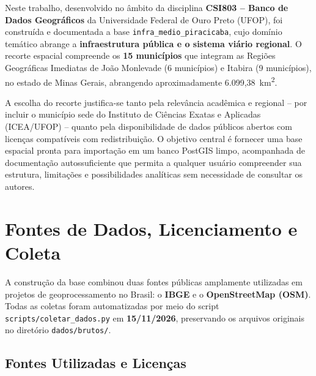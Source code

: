 \documentclass[
    12pt,
    oneside,
    a4paper,
    chapter=TITLE,
    section=TITLE,
    brazil
]{abntex2}
\begin{document}
Neste trabalho, desenvolvido no âmbito da disciplina \textbf{CSI803 -- Banco de Dados Geográficos} da Universidade Federal de Ouro Preto (UFOP), foi construída e documentada a base \texttt{infra\_medio\_piracicaba}, cujo domínio temático abrange a \textbf{infraestrutura pública e o sistema viário regional}. O recorte espacial compreende os \textbf{15 municípios} que integram as Regiões Geográficas Imediatas de João Monlevade (6 municípios) e Itabira (9 municípios), no estado de Minas Gerais, abrangendo aproximadamente 6.099,38~km\textsuperscript{2}.

A escolha do recorte justifica-se tanto pela relevância acadêmica e regional -- por incluir o município sede do Instituto de Ciências Exatas e Aplicadas (ICEA/UFOP) -- quanto pela disponibilidade de dados públicos abertos com licenças compatíveis com redistribuição. O objetivo central é fornecer uma base espacial pronta para importação em um banco PostGIS limpo, acompanhada de documentação autossuficiente que permita a qualquer usuário compreender sua estrutura, limitações e possibilidades analíticas sem necessidade de consultar os autores.

\chapter{Fontes de Dados, Licenciamento e Coleta}

A construção da base combinou duas fontes públicas amplamente utilizadas em projetos de geoprocessamento no Brasil: o \textbf{IBGE} e o \textbf{OpenStreetMap (OSM)}. Todas as coletas foram automatizadas por meio do script \texttt{scripts/coletar\_dados.py} em \textbf{15/11/2026}, preservando os arquivos originais no diretório \texttt{dados/brutos/}.

\section{Fontes Utilizadas e Licenças}
\end{document}
